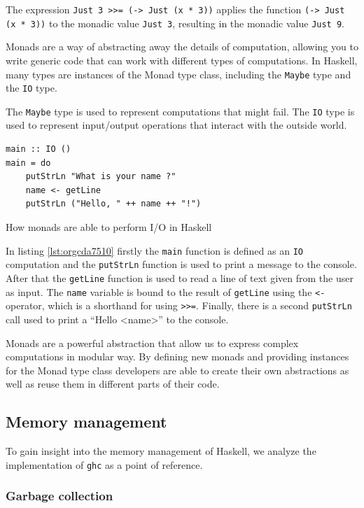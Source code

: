 \documentclass[a4paper, titlepage, twoside]{article}
\begin{document}
The expression \texttt{Just 3 >>= (\x -> Just (x * 3))} applies the function \texttt{(\x -> Just (x * 3))} to the monadic value \texttt{Just 3}, resulting in the monadic value \texttt{Just 9}.

Monads are a way of abstracting away the details of computation, allowing you to write generic code that can work with different types of computations. In Haskell, many types are instances of the Monad type class, including the \texttt{Maybe} type and the \texttt{IO} type.

The \texttt{Maybe} type is used to represent computations that might fail. The \texttt{IO} type is used to represent input/output operations that interact with the outside world.

\begin{listing}[htbp]
\begin{verbatim}
main :: IO ()
main = do
    putStrLn "What is your name ?"
    name <- getLine
    putStrLn ("Hello, " ++ name ++ "!")
\end{verbatim}
\caption{\label{lst:orgcda7510}How monads are able to perform I/O in Haskell}
\end{listing}

In listing \ref{lst:orgcda7510} firstly the \texttt{main} function is defined as an \texttt{IO} computation and the \texttt{putStrLn} function is used to print a message to the console. After that the \texttt{getLine} function is used to read a line of text given from the user as input. The \texttt{name} variable is bound to the result of \texttt{getLine} using the \texttt{<-} operator, which is a shorthand for using \texttt{>{}>{}=}. Finally, there is a second \texttt{putStrLn} call used to print a ``Hello <name>'' to the console.

Monads are a powerful abstraction that allow us to express complex computations in modular way. By defining new monads and providing instances for the Monad type class developers are able to create their own abstractions as well as reuse them in different parts of their code.

\subsection{Memory management}
\label{sec:org777e548}

To gain insight into the memory management of Haskell, we analyze the implementation of \texttt{ghc} as a point of reference.

\subsubsection{Garbage collection}
\label{sec:org1c47ca7}
\end{document}
